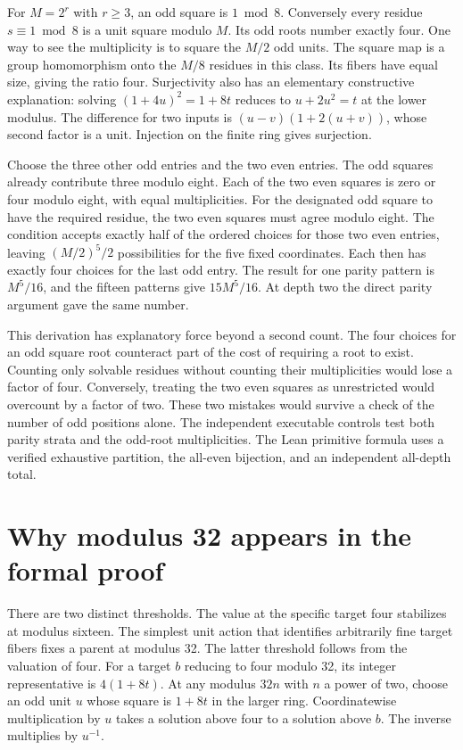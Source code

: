 \documentclass[12pt,letterpaper]{article}
\begin{document}
For $M=2^r$ with $r\ge3$, an odd square is $1\bmod8$. Conversely every residue $s\equiv1\bmod8$ is a unit square modulo $M$. Its odd roots number exactly four. One way to see the multiplicity is to square the $M/2$ odd units. The square map is a group homomorphism onto the $M/8$ residues in this class. Its fibers have equal size, giving the ratio four. Surjectivity also has an elementary constructive explanation: solving $(1+4u)^2=1+8t$ reduces to $u+2u^2=t$ at the lower modulus. The difference for two inputs is $(u-v)(1+2(u+v))$, whose second factor is a unit. Injection on the finite ring gives surjection.

Choose the three other odd entries and the two even entries. The odd squares already contribute three modulo eight. Each of the two even squares is zero or four modulo eight, with equal multiplicities. For the designated odd square to have the required residue, the two even squares must agree modulo eight. The condition accepts exactly half of the ordered choices for those two even entries, leaving $(M/2)^5/2$ possibilities for the five fixed coordinates. Each then has exactly four choices for the last odd entry. The result for one parity pattern is $M^5/16$, and the fifteen patterns give $15M^5/16$. At depth two the direct parity argument gave the same number.

This derivation has explanatory force beyond a second count. The four choices for an odd square root counteract part of the cost of requiring a root to exist. Counting only solvable residues without counting their multiplicities would lose a factor of four. Conversely, treating the two even squares as unrestricted would overcount by a factor of two. These two mistakes would survive a check of the number of odd positions alone. The independent executable controls test both parity strata and the odd-root multiplicities. The Lean primitive formula uses a verified exhaustive partition, the all-even bijection, and an independent all-depth total.
\section{Why modulus 32 appears in the formal proof}
There are two distinct thresholds. The value at the specific target four stabilizes at modulus sixteen. The simplest unit action that identifies arbitrarily fine target fibers fixes a parent at modulus 32. The latter threshold follows from the valuation of four. For a target $b$ reducing to four modulo 32, its integer representative is $4(1+8t)$. At any modulus $32n$ with $n$ a power of two, choose an odd unit $u$ whose square is $1+8t$ in the larger ring. Coordinatewise multiplication by $u$ takes a solution above four to a solution above $b$. The inverse multiplies by $u^{-1}$.
\end{document}
